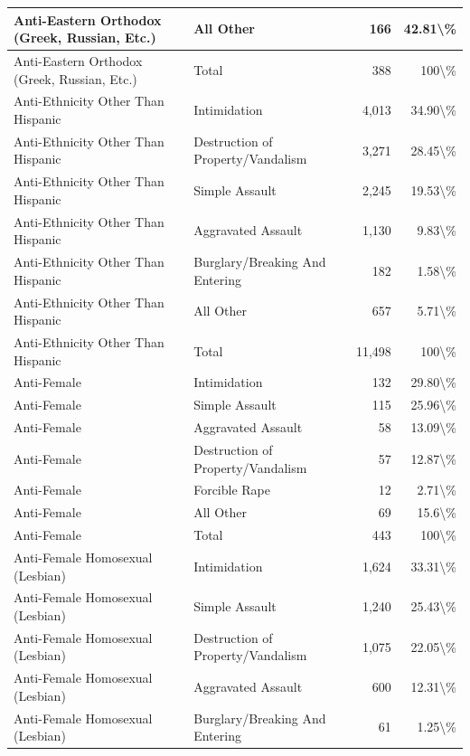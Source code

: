 \documentclass[
]{krantz}
\begin{document}
\begin{longtable}[t]{l|l|r|r}
\hline
Anti-Eastern Orthodox (Greek, Russian, Etc.) & All Other & 166 & 42.81\textbackslash{}\%\\
\hline
Anti-Eastern Orthodox (Greek, Russian, Etc.) & Total & 388 & 100\textbackslash{}\%\\
\hline
Anti-Ethnicity Other Than Hispanic & Intimidation & 4,013 & 34.90\textbackslash{}\%\\
\hline
Anti-Ethnicity Other Than Hispanic & Destruction of Property/Vandalism & 3,271 & 28.45\textbackslash{}\%\\
\hline
Anti-Ethnicity Other Than Hispanic & Simple Assault & 2,245 & 19.53\textbackslash{}\%\\
\hline
Anti-Ethnicity Other Than Hispanic & Aggravated Assault & 1,130 & 9.83\textbackslash{}\%\\
\hline
Anti-Ethnicity Other Than Hispanic & Burglary/Breaking And Entering & 182 & 1.58\textbackslash{}\%\\
\hline
Anti-Ethnicity Other Than Hispanic & All Other & 657 & 5.71\textbackslash{}\%\\
\hline
Anti-Ethnicity Other Than Hispanic & Total & 11,498 & 100\textbackslash{}\%\\
\hline
Anti-Female & Intimidation & 132 & 29.80\textbackslash{}\%\\
\hline
Anti-Female & Simple Assault & 115 & 25.96\textbackslash{}\%\\
\hline
Anti-Female & Aggravated Assault & 58 & 13.09\textbackslash{}\%\\
\hline
Anti-Female & Destruction of Property/Vandalism & 57 & 12.87\textbackslash{}\%\\
\hline
Anti-Female & Forcible Rape & 12 & 2.71\textbackslash{}\%\\
\hline
Anti-Female & All Other & 69 & 15.6\textbackslash{}\%\\
\hline
Anti-Female & Total & 443 & 100\textbackslash{}\%\\
\hline
Anti-Female Homosexual (Lesbian) & Intimidation & 1,624 & 33.31\textbackslash{}\%\\
\hline
Anti-Female Homosexual (Lesbian) & Simple Assault & 1,240 & 25.43\textbackslash{}\%\\
\hline
Anti-Female Homosexual (Lesbian) & Destruction of Property/Vandalism & 1,075 & 22.05\textbackslash{}\%\\
\hline
Anti-Female Homosexual (Lesbian) & Aggravated Assault & 600 & 12.31\textbackslash{}\%\\
\hline
Anti-Female Homosexual (Lesbian) & Burglary/Breaking And Entering & 61 & 1.25\textbackslash{}\%\\

\end{longtable}
\end{document}
